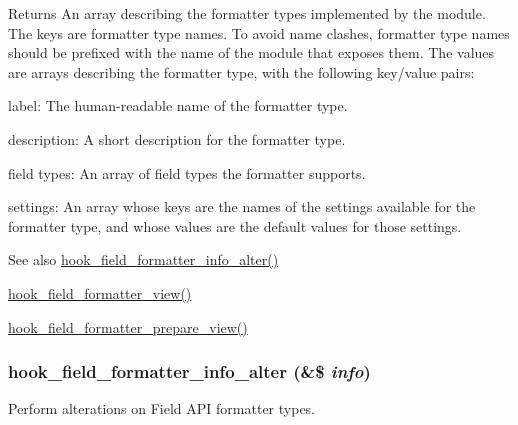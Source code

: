\begin{DoxyReturn}{Returns}
An array describing the formatter types implemented by the module. The keys are formatter type names. To avoid name clashes, formatter type names should be prefixed with the name of the module that exposes them. The values are arrays describing the formatter type, with the following key/value pairs:
\begin{DoxyItemize}
\item label: The human-\/readable name of the formatter type.
\item description: A short description for the formatter type.
\item field types: An array of field types the formatter supports.
\item settings: An array whose keys are the names of the settings available for the formatter type, and whose values are the default values for those settings.
\end{DoxyItemize}
\end{DoxyReturn}
\begin{DoxySeeAlso}{See also}
\hyperlink{group__field__formatter_ga42c57fcac0e7a09f757983224136a850}{hook\_\-field\_\-formatter\_\-info\_\-alter()} 

\hyperlink{group__field__formatter_gaa588d99481fa147a1c88416e55fdfad6}{hook\_\-field\_\-formatter\_\-view()} 

\hyperlink{group__field__formatter_ga2c1856869caa776fd9e5db4af4e0b57b}{hook\_\-field\_\-formatter\_\-prepare\_\-view()} 
\end{DoxySeeAlso}
\hypertarget{group__field__formatter_ga42c57fcac0e7a09f757983224136a850}{
\subsubsection[{hook\_\-field\_\-formatter\_\-info\_\-alter}]{\setlength{\rightskip}{0pt plus 5cm}hook\_\-field\_\-formatter\_\-info\_\-alter (\&\$ {\em info})}}
\label{group__field__formatter_ga42c57fcac0e7a09f757983224136a850}
Perform alterations on Field API formatter types.


